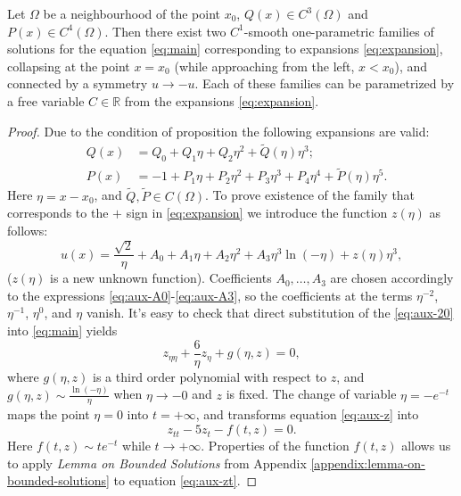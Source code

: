 \begin{proposition}
	Let $\Omega$ be a neighbourhood of the point $x_0$, $Q(x) \in C^3(\Omega)$ and $P(x) \in C^4(\Omega)$.
	Then there exist two $C^1$-smooth one-parametric families of solutions for the equation \eqref{eq:main} corresponding to expansions \eqref{eq:expansion}, collapsing at the point $x = x_0$ (while approaching from the left, $x < x_0$), and connected by a symmetry $u \to -u$.
	Each of these families can be parametrized by a free variable $C \in \mathbb{R}$ from the expansions \eqref{eq:expansion}.
\label{prop:singular-families}
\end{proposition}
\begin{proof}
	Due to the condition of proposition the following expansions are valid:
	\begin{eqnarray}
		& Q(x) & = Q_0 + Q_1 \eta + Q_2 \eta^2 + \widetilde{Q}(\eta) \eta^3; \\
		& P(x) & = -1 + P_1 \eta + P_2 \eta^2 + P_3 \eta^3 + P_4 \eta^4 + \widetilde{P}(\eta) \eta^5.
	\end{eqnarray}
	Here $\eta = x - x_0$, and $\widetilde{Q}, \widetilde{P} \in C(\Omega)$.
	To prove existence of the family that corresponds to the $+$ sign in \eqref{eq:expansion}	 we introduce the function $z(\eta)$ as follows:
	\begin{equation}
		u(x) = \dfrac{\sqrt{2}}{\eta} + A_0 + A_1 \eta + A_2 \eta^2 + A_3 \eta^3 \ln(-\eta) + z(\eta) \eta^3,
		\label{eq:aux-20}
	\end{equation}
	($z(\eta)$ is a new unknown function).
	Coefficients $A_0, \dots, A_3$ are chosen accordingly to the expressions \eqref{eq:aux-A0}-\eqref{eq:aux-A3}, so the coefficients at the terms $\eta^{-2}$, $\eta^{-1}$, $\eta^0$, and $\eta$ vanish.
	It's easy to check that direct substitution of the \eqref{eq:aux-20} into \eqref{eq:main} yields
	\begin{equation}
		z_{\eta\eta} + \dfrac{6}{\eta} z_{\eta} + g(\eta, z) = 0,
		\label{eq:aux-z}
	\end{equation}
	where $g(\eta, z)$ is a third order polynomial with respect to $z$, and $g(\eta, z) \sim \frac{\ln(-\eta)}{\eta}$ when $\eta \to -0$ and $z$ is fixed.
	The change of variable $\eta = -e^{-t}$ maps the point $\eta = 0$ into $t = +\infty$, and transforms equation \eqref{eq:aux-z} into
	\begin{equation}
		z_{tt} - 5z_t - f(t, z) = 0.
		\label{eq:aux-zt}
	\end{equation}
	Here $f(t, z) \sim t e^{-t}$ while $t \to +\infty$.
	Properties of the function $f(t, z)$ allows us to apply {\it Lemma on Bounded Solutions} from Appendix \ref{appendix:lemma-on-bounded-solutions} to equation \eqref{eq:aux-zt}.

\end{proof}
